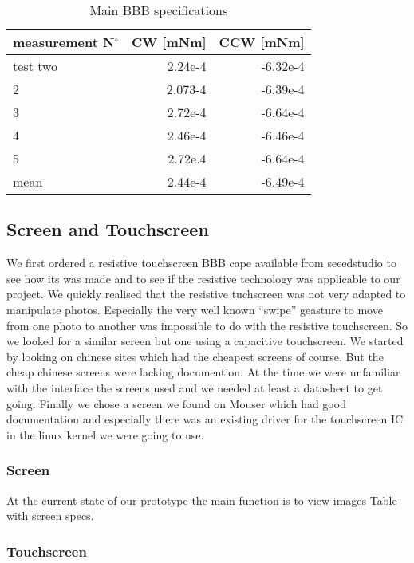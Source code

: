 \begin{table}[!htbp]
  \begin{center}
    \begin{tabular}{|l|r|r|}%
      \hline
        measurement N$^{\circ}$ & CW [mNm] & CCW [mNm]\\ \hline %
        test two & 2.24e-4 & -6.32e-4 \\ \hline
        2 & 2.073-4 & -6.39e-4\\ \hline
        3 & 2.72e-4 & -6.64e-4\\ \hline
        4 & 2.46e-4 & -6.46e-4\\ \hline
        5 & 2.72e.4 & -6.64e-4\\ \hline \hline
        mean & 2.44e-4 & -6.49e-4\\
         \hline
    \end{tabular}
  \end{center}
  \caption {Main BBB specifications} \label{tab:bbb specs}
\end{table}
\subsection{Screen and Touchscreen}
We first ordered a resistive touchscreen BBB cape available from seeedstudio to see how its was made and to see if the resistive technology was applicable to our project. We quickly realised that the resistive tuchscreen was not very adapted to manipulate photos. Especially the very well known “swipe” geasture to move from one photo to another was impossible to do with the resistive touchscreen.
So we looked for a similar screen but one using a capacitive touchscreen. We started by looking on chinese sites which had the cheapest screens of course. But the cheap chinese screens were lacking documention. At the time we were unfamiliar with the interface the screens used and we needed at least a datasheet to get going.
 Finally we chose a screen we found on Mouser which had good documentation and especially there was an existing driver for the touchscreen IC in the linux kernel we were going to use.
\subsubsection{Screen}
At the current state of our prototype the main function is to view images
Table with screen specs.
\subsubsection{Touchscreen}
